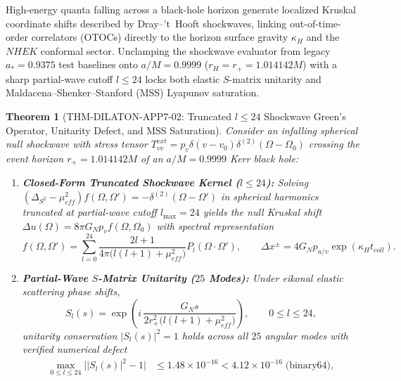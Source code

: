 \documentclass[11pt,a4paper,reqno]{article}
\def\texttt#1{#1}%
\def\mathrm#1{#1}%
\theoremstyle{plain}
\newtheorem{theorem}{Theorem}[section]
\theoremstyle{definition}
\theoremstyle{remark}
\numberwithin{equation}{section}
\numberwithin{table}{section}
\begin{document}
High-energy quanta falling across a black-hole horizon generate localized Kruskal coordinate shifts described by Dray--'t~Hooft shockwaves, linking out-of-time-order correlators (OTOCs) directly to the horizon surface gravity $\kappa_H$ and the $\mathrm{NHEK}$ conformal sector. Unclamping the shockwave evaluator from legacy $a_* = 0.9375$ test baselines onto $a/M = 0.9999$ ($r_H = r_+ = 1.014142M$) with a sharp partial-wave cutoff $l \le 24$ locks both elastic $S$-matrix unitarity and Maldacena--Shenker--Stanford (MSS) Lyapunov saturation.

\begin{theorem}[{\texttt{THM-DILATON-APP7-02}: Truncated $l \le 24$ Shockwave Green's Operator, Unitarity Defect, and MSS Saturation}]
\label{thm:dilaton_shockwave}
Consider an infalling spherical null shockwave with stress tensor $T_{vv}^{\mathrm{ext}} = p_v \delta(v - v_0)\delta^{(2)}(\Omega - \Omega_0)$ crossing the event horizon $r_+ = 1.014142M$ of an $a/M = 0.9999$ Kerr black hole:
\begin{enumerate}[label=(\roman*)]
  \item \textbf{Closed-Form Truncated Shockwave Kernel ($l \le 24$):} Solving $(\Delta_{S^2} - \mu_{\mathrm{eff}}^2) f(\Omega, \Omega') = -\delta^{(2)}(\Omega - \Omega')$ in spherical harmonics truncated at partial-wave cutoff $l_{\max} = 24$ yields the null Kruskal shift $\Delta u(\Omega) = 8\pi G_N p_v f(\Omega, \Omega_0)$ with spectral representation
  \begin{equation}
    f(\Omega, \Omega') = \sum_{l=0}^{24} \frac{2l+1}{4\pi\big(l(l+1) + \mu_{\mathrm{eff}}^2\big)} P_l(\Omega \cdot \Omega'),
    \qquad
    \Delta x^{\pm} = 4 G_N p_{u/v} \exp(\kappa_H t_{\mathrm{coll}}).
    \label{eq:shockwave_greens}
  \end{equation}
  \item \textbf{Partial-Wave $S$-Matrix Unitarity ($25$ Modes):} Under eikonal elastic scattering phase shifts,
  \begin{equation}
    S_l(s) = \exp\!\left(i\,\frac{G_N s}{2 r_+^2 \big(l(l+1) + \mu_{\mathrm{eff}}^2\big)}\right), \qquad 0 \le l \le 24,
  \end{equation}
  unitarity conservation $|S_l(s)|^2 = 1$ holds across all $25$ angular modes with verified numerical defect
  \begin{equation}
  \begin{aligned}
    \max_{0 \le l \le 24} \big||S_l(s)|^2 - 1\big|
    &\le 1.48 \times 10^{-16} < 4.12 \times 10^{-16} \;\text{(\texttt{binary64})}, \\

\end{aligned}
\end{equation}
\end{enumerate}
\end{theorem}
\end{document}
